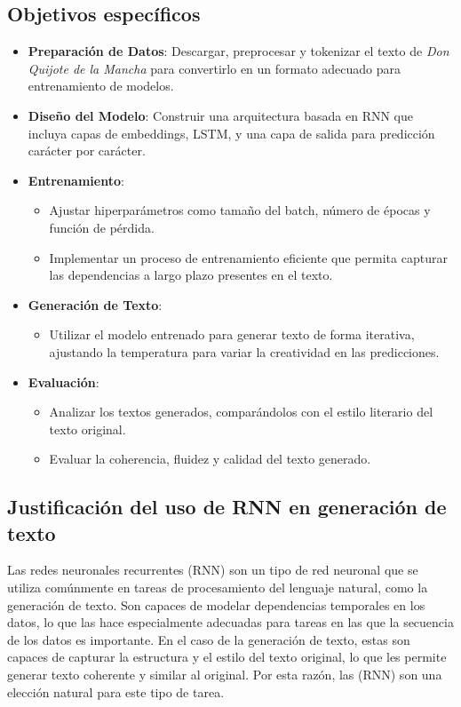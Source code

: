 \documentclass{article}
\begin{document}
\subsection{Objetivos específicos}

\begin{itemize}
    \item \textbf{Preparación de Datos}: Descargar, preprocesar y tokenizar el texto de \emph{Don Quijote de la Mancha} para convertirlo en un formato adecuado para entrenamiento de modelos.
    \item \textbf{Diseño del Modelo}: Construir una arquitectura basada en RNN que incluya capas de embeddings, LSTM, y una capa de salida para predicción carácter por carácter.
    \item \textbf{Entrenamiento}:
    \begin{itemize}
        \item Ajustar hiperparámetros como tamaño del batch, número de épocas y función de pérdida.
        \item Implementar un proceso de entrenamiento eficiente que permita capturar las dependencias a largo plazo presentes en el texto.
    \end{itemize}
    \item \textbf{Generación de Texto}:
    \begin{itemize}
        \item Utilizar el modelo entrenado para generar texto de forma iterativa, ajustando la temperatura para variar la creatividad en las predicciones.
    \end{itemize}
    \item \textbf{Evaluación}:
    \begin{itemize}
        \item Analizar los textos generados, comparándolos con el estilo literario del texto original.
        \item Evaluar la coherencia, fluidez y calidad del texto generado.
    \end{itemize}
\end{itemize}

\subsection{Justificación del uso de RNN en generación de texto}
Las redes neuronales recurrentes (RNN) son un tipo de red neuronal que se utiliza comúnmente en tareas de procesamiento del lenguaje natural, como la generación de texto. Son capaces de modelar dependencias temporales en los datos, lo que las hace especialmente adecuadas para tareas en las que la secuencia de los datos es importante.
En el caso de la generación de texto, estas son capaces de capturar la estructura y el estilo del texto original, lo que les permite generar texto coherente y similar al original. Por esta razón, las (RNN) son una elección natural para este tipo de tarea.
\end{document}
